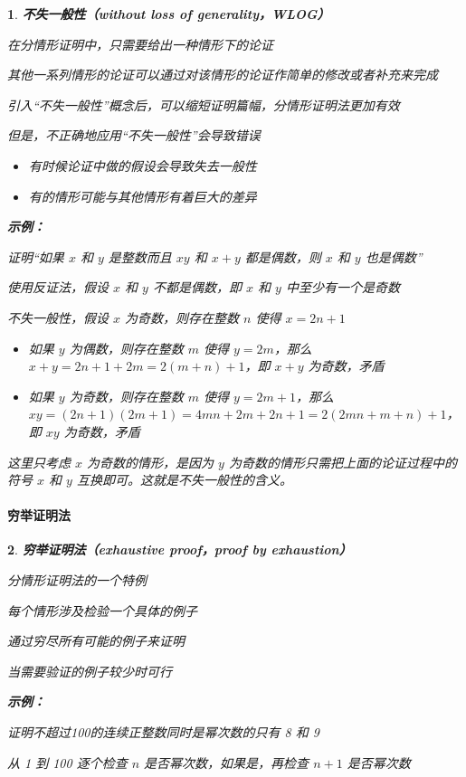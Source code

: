 \documentclass[UTF8]{report}
\theoremstyle{MyLineTheoremStyle} %
\theoremstyle{MyBlockTheoremStyle} %
\theoremstyle{MySubsubsectionStyle} %
\newtheorem{definition}{}
\begin{document}
\begin{definition}
    \textbf{不失一般性（without loss of generality，WLOG）}\par
    在分情形证明中，只需要给出一种情形下的论证\par
    其他一系列情形的论证可以通过对该情形的论证作简单的修改或者补充来完成\par
    引入“不失一般性”概念后，可以缩短证明篇幅，分情形证明法更加有效\par
    但是，不正确地应用“不失一般性”会导致错误\par
    \begin{itemize}
        \item 有时候论证中做的假设会导致失去一般性
        \item 有的情形可能与其他情形有着巨大的差异
    \end{itemize}

    \textbf{示例：}\par
    证明“如果 $x$ 和 $y$ 是整数而且 $xy$ 和 $x + y$ 都是偶数，则 $x$ 和 $y$ 也是偶数”\par
    使用反证法，假设 $x$ 和 $y$ 不都是偶数，即 $x$ 和 $y$ 中至少有一个是奇数\par
    不失一般性，假设 $x$ 为奇数，则存在整数 $n$ 使得 $x = 2n + 1$\par
    \begin{itemize}
        \item 如果 $y$ 为偶数，则存在整数 $m$ 使得 $y = 2m$，那么 $x + y = 2n + 1 + 2m = 2(m + n) + 1$，即 $x + y$ 为奇数，矛盾
        \item 如果 $y$ 为奇数，则存在整数 $m$ 使得 $y = 2m + 1$，那么 $xy = (2n + 1)(2m + 1) = 4mn + 2m + 2n + 1 = 2(2mn + m + n) + 1$，即 $xy$ 为奇数，矛盾
    \end{itemize}
    这里只考虑 $x$ 为奇数的情形，是因为 $y$ 为奇数的情形只需把上面的论证过程中的符号 $x$ 和 $y$ 互换即可。这就是不失一般性的含义。\par
\end{definition}

\paragraph{穷举证明法}

\begin{definition}
    \textbf{穷举证明法（exhaustive proof，proof by exhaustion）}\par
    分情形证明法的一个特例\par
    每个情形涉及检验一个具体的例子\par
    通过穷尽所有可能的例子来证明\par
    当需要验证的例子较少时可行\par

    \textbf{示例：}\par
    证明不超过100的连续正整数同时是幂次数的只有 8 和 9\par
    从 1 到 100 逐个检查 $n$ 是否幂次数，如果是，再检查 $n + 1$ 是否幂次数\par
\end{definition}
\end{document}
